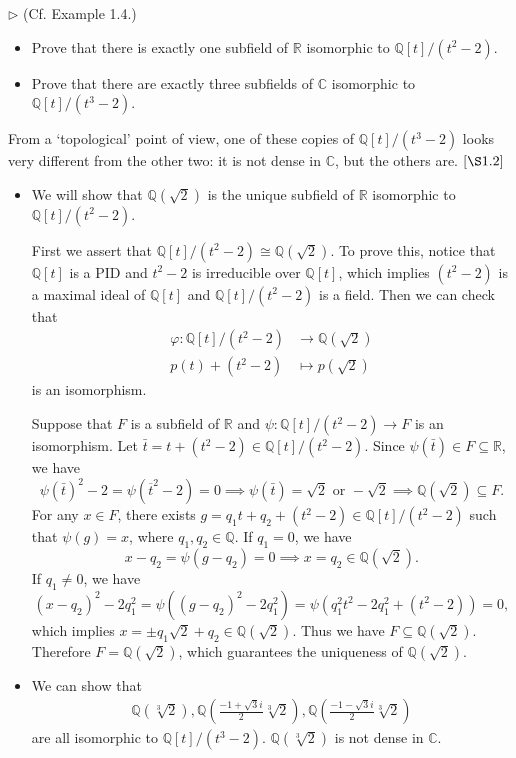 \documentclass[12pt,letterpaper,boxed]{hmcpset}
\begin{document}
\begin{problem}[1.5]
$\triangleright$ (Cf. Example 1.4.)
	\begin{itemize}
	\item Prove that there is exactly one subfield of $\mathbb{R}$ isomorphic to $\mathbb{Q}[t] /\left(t^{2}-2\right)$.
	\item  Prove that there are exactly three subfields of $\mathbb{C}$ isomorphic to $\mathbb{Q}[t] /\left(t^{3}-2\right)$.
	\end{itemize}
From a `topological' point of view, one of these copies of $\mathbb{Q}[t] /\left(t^{3}-2\right)$ looks very different from the other two: it is not dense in $\mathbb{C}$, but the others are. $[\S 1.2]$
\end{problem}
\begin{solution}
	\begin{itemize}
		\item We will show that $\mathbb{Q}(\sqrt{2})$ is the unique subfield of $\mathbb{R}$ isomorphic to $\mathbb{Q}[t] /\left(t^{2}-2\right)$. 
  
		First we assert that $\mathbb{Q}[t] /\left(t^{2}-2\right)\cong\mathbb{Q}(\sqrt{2})$. To prove this, notice that $\mathbb{Q}[t]$ is a PID and $t^2-2$ is irreducible over $\mathbb{Q}[t]$, which implies $\left(t^{2}-2\right)$ is a maximal ideal of $\mathbb{Q}[t]$ and $\mathbb{Q}[t] /\left(t^{2}-2\right)$ is a field. Then we can check that
		\begin{align*}
			\varphi:\mathbb{Q}[t] /\left(t^{2}-2\right)&\longrightarrow \mathbb{Q}(\sqrt{2}) \\
			p(t)+(t^2-2)&\longmapsto p(\sqrt{2})
		\end{align*}
		is an isomorphism.

		Suppose that $F$ is a subfield of $\mathbb{R}$ and $\psi:\mathbb{Q}[t] /\left(t^{2}-2\right)\to F$ is an isomorphism. Let $\bar{t}=t+(t^2-2)\in \mathbb{Q}[t] /\left(t^{2}-2\right)$. Since $\psi(\bar{t})\in F\subseteq\mathbb{R}$, we have
		\[
			\psi\left(\bar{t}\right)^2-2=\psi\left(\overline{t}^2-2\right)=0\implies \psi(\bar{t})=\sqrt{2}\text{ or }-\sqrt{2}\implies \mathbb{Q}(\sqrt{2})\subseteq F.
		\]
		For any $x\in F$, there exists $g=q_1t+q_2+\left(t^{2}-2\right)\in\mathbb{Q}[t] /\left(t^{2}-2\right)$ such that $\psi(g)=x$, where $q_1,q_2\in\mathbb{Q}$. If $q_1=0$, we have
		\[
			x-q_2=\psi(g-q_2)=0\implies x=q_2\in \mathbb{Q}(\sqrt{2}).
		\]
		If $q_1\ne0$, we have
		\[
			(x-q_2)^2-2q_1^2=\psi((g-q_2)^2-2q_1^2)=\psi(q_1^2t^2-2q_1^2+(t^2-2))=0,
		\]
		which implies $x=\pm q_1\sqrt{2}+q_2\in \mathbb{Q}(\sqrt{2})$. Thus we have $F\subseteq\mathbb{Q}(\sqrt{2})$. Therefore $F=\mathbb{Q}(\sqrt{2})$, which guarantees the uniqueness of $\mathbb{Q}(\sqrt{2})$.
		\item  We can show that 
		\begin{align*}
			\mathbb{Q}(\sqrt[3]{2}),\mathbb{Q}\left(\frac{-1+\sqrt{3}i}{2}\sqrt[3]{2}\right),\mathbb{Q}\left(\frac{-1-\sqrt{3}i}{2}\sqrt[3]{2}\right)
		\end{align*}
		are all isomorphic to $\mathbb{Q}[t] /\left(t^{3}-2\right)$. $\mathbb{Q}(\sqrt[3]{2})$ is not dense in $\mathbb{C}$.
	\end{itemize}
\end{solution}
\end{document}
